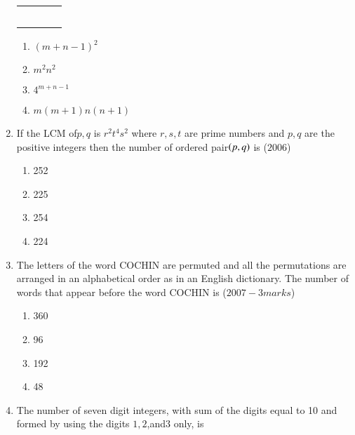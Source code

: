 \documentclass[journal,12pt,twocolumn]{IEEEtran}
\theoremstyle{remark}
\begin{document}
\begin{enumerate}[start=3]
\begin{center}
\begin{tabular}{|c|c|c|c|}
\hline
\quad&\quad&\quad&\quad\\
\hline
\quad&\quad&\quad&\quad\\
\hline
\quad&\quad&\quad&\quad\\
\hline\quad&\quad&\quad&\quad\\
\hline\quad&\quad&\quad&\quad\\
\hline\quad&\quad&\quad&\quad\\
\hline
\end{tabular}
\end{center}
\begin{multicols}{2} 
\begin{enumerate}
\item  $(m+n-1)^2$
\item  $m^2n^2$\columnbreak\item  $4^{m+n-1}$\item $m(m+1)n(n+1)$
\end{enumerate}
\end{multicols}
\item If the LCM of$p,q$ is $r^2t^4s^2$ where $r,s,t$ are prime numbers and $p,q$ are the positive integers then the number of ordered pair$\left(p,q\right)$ is \hfill{($2006$)}\\
\begin{multicols}{2} 
\begin{enumerate}
\item  252\item  225\columnbreak\item  254\item  224
\end{enumerate}
\end{multicols}
\item The letters of the word COCHIN are permuted and all the permutations are arranged in an alphabetical order as in an English dictionary. The number of words that appear before the word COCHIN is
\hfill{($2007-3 marks$)}\\
\begin{multicols}{2} 
\begin{enumerate}
\item  360\item  96\columnbreak\item 192\item  48
\end{enumerate}
\end{multicols}
\item The number of seven digit integers, with sum of the digits equal to 10 and formed by using the digits $1,2$,and$3$ only, is

\end{enumerate}
\end{document}
